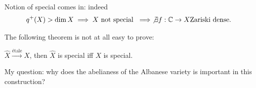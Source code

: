 Notion of special comes in: indeed
 $$
q^+(X)>\dim X \implies X \text{ not special
}\implies
\not\exists f:\mathbb{C}\to X \text{Zariski
dense}.
$$

The following theorem is not at all easy to
prove:
\begin{theorem}[Campana]
\label{theorem-campana}
$\hat{X}\xrightarrow{\text{étale} }X$, then
$\hat{X}$ is special iff $X$ is special.
\end{theorem}

\noindent
My question: why does the abelianess of
the Albanese variety is important in this
construction?








